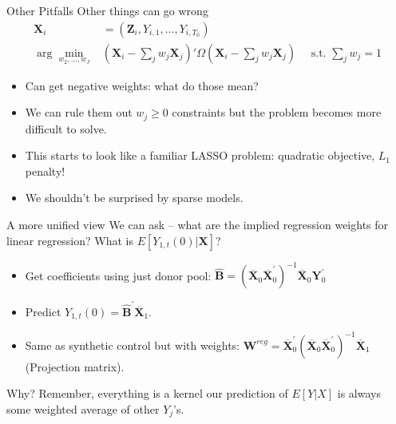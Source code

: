 \documentclass[xcolor=pdftex,dvipsnames,table,mathserif,aspectratio=169]{beamer}
\begin{document}
\begin{frame}{Other Pitfalls}
Other things can go wrong
\begin{align*}
\mathbf{X}_{i}&=\left(\mathbf{Z}_{i}, Y_{i,1},\ldots, Y_{i,T_0} \right)\\
\arg \min_{w_2,\ldots, w_J}&  (\mathbf{X}_{i}-\sum_j w_j \mathbf{X}_{j})' \Omega  (\mathbf{X}_{i}-\sum_j w_j \mathbf{X}_{j}) \quad \text{ s.t. }  \sum_j w_j =1
\end{align*}

\begin{itemize}
\item Can get negative weights: what do those mean? 
\item We can rule them out $w_j \geq 0$ constraints but the problem becomes more difficult to solve.
\item This starts to look like a familiar LASSO problem: quadratic objective, $L_1$ penalty!
\item We shouldn't be surprised by sparse models.
\end{itemize}
\end{frame}

\begin{frame}{A more unified view}
We can ask -- what are the implied regression weights for linear regression? What is $E[Y_{1,t}(0) | \mathbf{X}]$?
\begin{itemize}
\item Get coefficients using just donor pool: $\widehat{\boldsymbol{B}}=\left(\overline{\boldsymbol{X}}_{0} \overline{\boldsymbol{X}}_{0}^{\prime}\right)^{-1} \overline{\boldsymbol{X}}_{0} \boldsymbol{Y}_{0}^{\prime}$
\item Predict $Y_{1,t}(0) = \widehat{\boldsymbol{B}}^{\prime} \overline{\boldsymbol{X}}_{1}$.
\item Same as synthetic control but with weights: $\boldsymbol{W}^{r e g}=\overline{\boldsymbol{X}}_{0}^{\prime}\left(\overline{\boldsymbol{X}}_{0} \overline{\boldsymbol{X}}_{0}^{\prime}\right)^{-1} \overline{\boldsymbol{X}}_{1}$ (Projection matrix).
\end{itemize}
Why? Remember, \alert{everything is a kernel} our prediction of $E[Y | X]$ is always some weighted average of other $Y_j$'s.
\end{frame}
\end{document}
